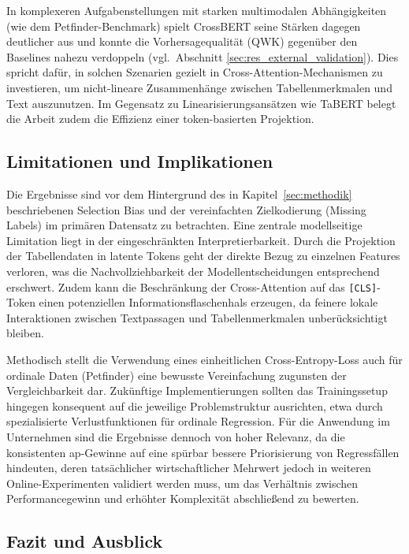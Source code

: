 In komplexeren Aufgabenstellungen mit starken multimodalen Abhängigkeiten (wie dem Petfinder-Benchmark) spielt CrossBERT seine Stärken dagegen deutlicher aus und konnte die Vorhersagequalität (QWK) gegenüber den Baselines nahezu verdoppeln (vgl.\ Abschnitt \ref{sec:res_external_validation}). Dies spricht dafür, in solchen Szenarien gezielt in Cross-Attention-Mechanismen zu investieren, um nicht-lineare Zusammenhänge zwischen Tabellenmerkmalen und Text auszunutzen. Im Gegensatz zu Linearisierungsansätzen wie TaBERT \cite{Yin2020} belegt die Arbeit zudem die Effizienz einer token-basierten Projektion.

\subsection{Limitationen und Implikationen}
Die Ergebnisse sind vor dem Hintergrund des in Kapitel~\ref{sec:methodik} beschriebenen Selection Bias und der vereinfachten Zielkodierung (Missing Labels) im primären Datensatz zu betrachten. Eine zentrale modellseitige Limitation liegt in der eingeschränkten Interpretierbarkeit. Durch die Projektion der Tabellendaten in latente Tokens geht der direkte Bezug zu einzelnen Features verloren, was die Nachvollziehbarkeit der Modellentscheidungen entsprechend erschwert. Zudem kann die Beschränkung der Cross-Attention auf das \texttt{[CLS]}-Token einen potenziellen Informationsflaschenhals erzeugen, da feinere lokale Interaktionen zwischen Textpassagen und Tabellenmerkmalen unberücksichtigt bleiben.

Methodisch stellt die Verwendung eines einheitlichen Cross-Entropy-Loss auch für ordinale Daten (Petfinder) eine bewusste Vereinfachung zugunsten der Vergleichbarkeit dar. Zukünftige Implementierungen sollten das Trainingssetup hingegen konsequent auf die jeweilige Problemstruktur ausrichten, etwa durch spezialisierte Verlustfunktionen für ordinale Regression. Für die Anwendung im Unternehmen sind die Ergebnisse dennoch von hoher Relevanz, da die konsistenten \Gls{ap}-Gewinne auf eine spürbar bessere Priorisierung von Regressfällen hindeuten, deren tatsächlicher wirtschaftlicher Mehrwert jedoch in weiteren Online-Experimenten validiert werden muss, um das Verhältnis zwischen Performancegewinn und erhöhter Komplexität abschließend zu bewerten.

\newpage
\subsection{Fazit und Ausblick}

